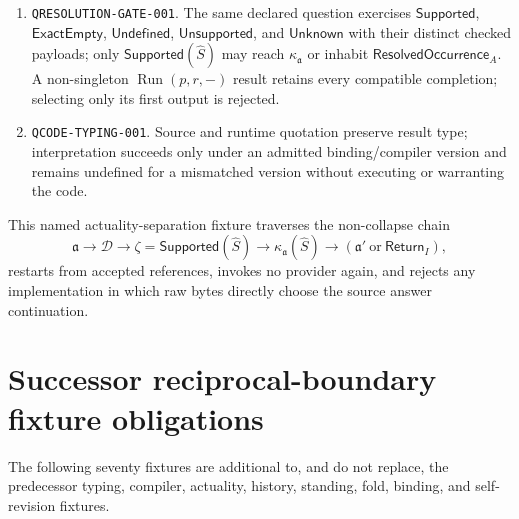\documentclass[11pt,oneside]{article}
\newcommand{\AskRef}{\mathfrak a}
\begin{document}
\begin{enumerate}
      discharge mode; arbitrary parent/member selection and common-mode collapse are rejected.  A
      proper finite materialization \(F\subsetneq|\widehat S|\) retains uncovered members as
      \(\mathsf{Unknown}\) and cannot claim a complete family.
\item \texttt{QRESOLUTION-GATE-001}. The same declared question exercises
      \(\mathsf{Supported}\), \(\mathsf{ExactEmpty}\), \(\mathsf{Undefined}\),
      \(\mathsf{Unsupported}\), and \(\mathsf{Unknown}\) with their distinct checked payloads; only
      \(\mathsf{Supported}(\widehat S)\) may reach \(\kappa_{\AskRef}\) or inhabit
      \(\mathsf{ResolvedOccurrence}_A\).  A non-singleton
      \(\operatorname{Run}(p,r,-)\) result retains every compatible completion; selecting only its
      first output is rejected.
\item \texttt{QCODE-TYPING-001}. Source and runtime quotation preserve result type; interpretation
      succeeds only under an admitted binding/compiler version and remains undefined for a
      mismatched version without executing or warranting the code.
\end{enumerate}

This named actuality-separation fixture traverses the non-collapse chain
\[
\AskRef\to\mathcal D\to\zeta=\mathsf{Supported}(\widehat S)
\to\kappa_{\AskRef}(\widehat S)
\to(\AskRef'\ \text{or}\ \mathsf{Return}_I),
\]
restarts from accepted references, invokes no provider again, and rejects any implementation in
which raw bytes directly choose the source answer continuation.

\section{Successor reciprocal-boundary fixture obligations}\label{sec:successor-fixtures}

The following seventy fixtures are additional to, and do not replace, the predecessor typing, compiler, actuality, history, standing, fold, binding, and self-revision fixtures.
\end{document}
